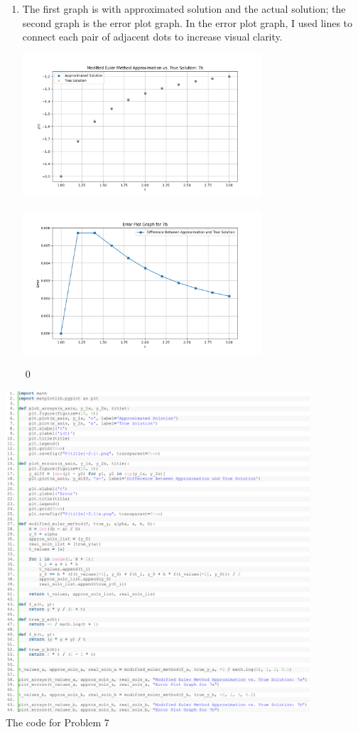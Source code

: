 \documentclass[11pt]{article}
\theoremstyle{break}
\numberwithin{equation}{theorem}
\begin{document}
\begin{enumerate}
    \item The first graph is with approximated solution and the actual solution; the second graph is the error plot graph. In the error plot graph, I used lines to connect each pair of adjacent dots to increase visual clarity.
    \begin{center}
        \includegraphics[width=0.7\textwidth]{P7b.png}
    \end{center}
    \begin{center}
        \includegraphics[width=0.7\textwidth]{P7be.png}
    \end{center} \qed
\end{enumerate}

\begin{center}
    \includegraphics[width=0.85\textwidth]{P7.png}\\
    The code for Problem 7
\end{center}
\end{document}

